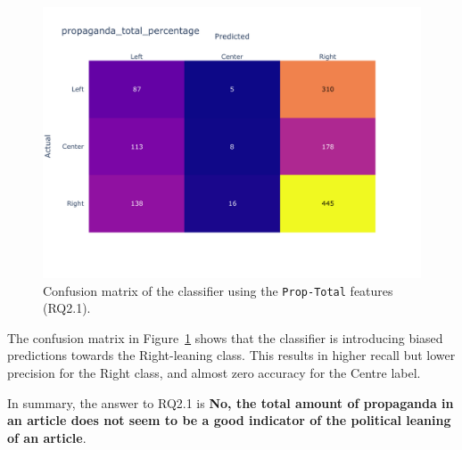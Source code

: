 \begin{figure}[!htbp]
    \centering
    \includegraphics[width=0.75\linewidth]{figures/baly_media_confusion_matrix_propaganda_total_percentage.pdf}
    \caption{Confusion matrix of the classifier using the \texttt{Prop-Total} features (RQ2.1).}
    \label{fig:total_prop_confusion}
\end{figure}

The confusion matrix in Figure~\ref{fig:total_prop_confusion} shows that the classifier is introducing biased predictions towards the Right-leaning class. %
This results in higher recall but lower precision for the Right class, and almost zero accuracy for the Centre label. 

In summary, the answer to RQ2.1 is \textbf{No, the total amount of propaganda in an article does not seem to be a good indicator of the political leaning of an article}.


